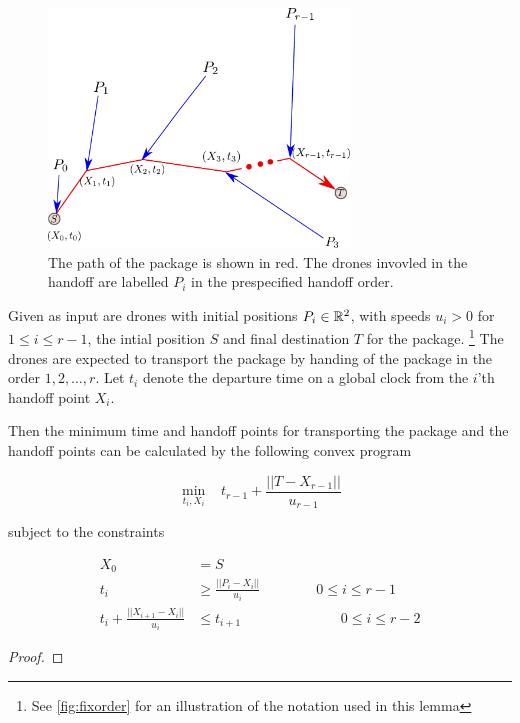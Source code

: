 \documentclass[12pt, english, oneside]{report}
\begin{document}
\begin{figure}[H]
\centering
\includegraphics[width=8cm]{docs/pho-cvx.pdf}
\caption{The path of the package is shown in red. The drones invovled in the handoff are 
labelled $P_i$ in the prespecified handoff order.}
\end{figure}
\label{fig:fixorder}

\begin{flem} \label{lem:fixorder}
Given as input are drones with initial positions $P_i \in \mathbb{R}^2$, with speeds $u_i>0$ 
for  $1 \leq i \leq r-1$, the intial position $S$ and final destination $T$ 
for the package. \footnote{See \autoref{fig:fixorder} for an illustration of the notation used in this lemma} 
The drones are expected to transport the package by handing of the package in the order $1,2,\ldots, r$.
Let $t_i$ denote the departure time on a global clock from the $i$'th handoff point $X_i$. 

Then the minimum time and handoff points for transporting the package and the handoff points 
can be calculated by the following convex program

\begin{equation*}
\min_{t_i, X_i} \; \; \; t_{r-1} + \frac{||T-X_{r-1}||}{u_{r-1}}
\end{equation*}

subject to the constraints

\begin{align*}
X_0 &= S\\  
t_i &\geq \frac{||P_i-X_i||}{u_i} \qquad \qquad 0 \leq i \leq r-1\\
t_i + \frac{||X_{i+1}-X_i||}{u_i} &\leq t_{i+1} \qquad \qquad \qquad \;\;\;\; 0 \leq i \leq r-2
\end{align*}

\end{flem}

\begin{proof}
\end{proof}
\end{document}
